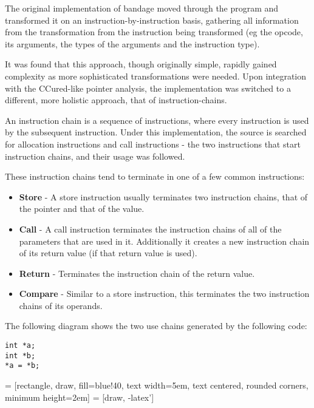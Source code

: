 The original implementation of bandage moved through the program and transformed it on an instruction-by-instruction basis, gathering all information from the transformation from the instruction being transformed (eg the opcode, its arguments, the types of the arguments and the instruction type).

It was found that this approach, though originally simple, rapidly gained complexity as more sophisticated transformations were needed.
Upon integration with the CCured-like pointer analysis, the implementation was switched to a different, more holistic approach, that of instruction-chains.

An instruction chain is a sequence of instructions, where every instruction is used by the subsequent instruction.
Under this implementation, the source is searched for allocation instructions and call instructions - the two instructions that start instruction chains, and their usage was followed.

These instruction chains tend to terminate in one of a few common instructions:

\begin{itemize}
\item \textbf{Store} - A store instruction usually terminates two instruction chains, that of the pointer and that of the value.
\item \textbf{Call} - A call instruction terminates the instruction chains of all of the parameters that are used in it. Additionally it creates a new instruction chain of its return value (if that return value is used).
\item \textbf{Return} - Terminates the instruction chain of the return value.
\item \textbf{Compare} - Similar to a store instruction, this terminates the two instruction chains of its operands.
\end{itemize}

The following diagram shows the two use chains generated by the following code:

\begin{verbatim}
int *a;
int *b;
*a = *b;
\end{verbatim}
 = [rectangle, draw, fill=blue!40, 
    text width=5em, text centered, rounded corners, minimum height=2em]
 = [draw, -latex']

